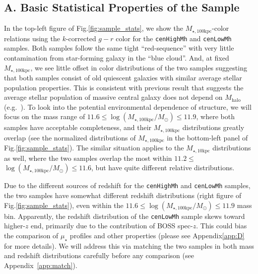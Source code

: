 \documentclass{emulateapj}
\def\rbcg{\texttt{cenHighMh}}
\def\nbcg{\texttt{cenLowMh}}
\def\mhalo{{$M_{\mathrm{halo}}$}}
\def\minn{{$M_{\star,10\mathrm{kpc}}$}}
\def\mtot{{$M_{\star,100\mathrm{kpc}}$}}
\def\logmtot{{$\log (M_{\star,100\mathrm{kpc}}/M_{\odot})$}}
\def\mden{{$\mu_{\star}$}}
\newcommand{\update}[1]{\textcolor{Bittersweet}{#1}}
\begin{document}
\begin{CJK*}{UTF8}{gbsn}




\appendix


\section{A. Basic Statistical Properties of the Sample} 
	\label{app:basic}
    
    \update{
    In the top-left figure of Fig.\ref{fig:sample_stats}, we show the \mtot{}-color 
    relations using the $k$-corrected $g-r$ color for the \rbcg{} and \nbcg{} 
    samples. 
    Both samples follow the same tight ``red-sequence'' with very little contamination 
    from star-forming galaxy in the ``blue cloud''.
    And, at fixed \mtot{}, we see little offset in color distributions of the two 
    samples suggesting that both samples consist of old quiescent galaxies with 
    similar average stellar population properties.  
    This is consistent with previous result that suggests the average stellar 
    population of massive central galaxy does not depend on \mhalo{} 
    (e.g.\ \citealt{Park2007}).  
    To look into the potential environmental dependence of structure, we will 
    focus on the mass range of $11.6 \le$\logmtot{}$\le 11.9$, where both samples 
    have acceptable completeness, and their \mtot{} distributions greatly overlap
    (see the normalized distributions of \mtot{} in the bottom-left panel of 
    Fig.\ref{fig:sample_stats}). 
    The similar situation applies to the \minn{} distributions as well, where 
    the two samples overlap the most within $11.2 \le$\logmtot{}$\le 11.6$, but 
    have quite different relative distributions.}
    
    \update{
    Due to the different sources of redshift for the \rbcg{} and \nbcg{} samples, 
    the two samples have somewhat different redshift distributions 
    (right figure of Fig.\ref{fig:sample_stats}), even within the 
    $11.6 \le$\logmtot{}$\le 11.9$ mass bin.  
    Apparently, the redshift distribution of the \nbcg{} sample skews toward 
    higher-$z$ end, primarily due to the contribution of BOSS spec-$z$.
    This could bias the comparison of \mden{} profiles and other properties 
    (please see Appendix\ref{app:D} for more details).  
    We will address this via matching the two samples in both mass and redshift
    distributions carefully before any comparison (see Appendix~\ref{app:match}).}
    

\end{CJK*}
\end{document}
